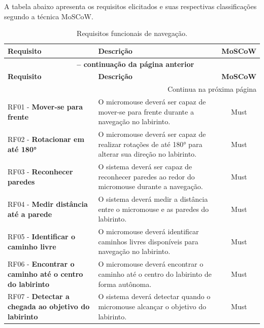     A tabela abaixo apresenta os requisitos elicitados e suas respectivas classificações segundo a técnica MoSCoW.

    \begin{center}
    \begin{longtable}{|p{5.5cm}|p{8cm}|c|}
    \caption{Requisitos funcionais de navegação.} \label{tab:navegacao} \\
    \hline
    \textbf{Requisito} & \textbf{Descrição} & \textbf{MoSCoW} \\ \hline
    \endfirsthead
    \multicolumn{3}{c}{{\bfseries \tablename\ \thetable{} -- continuação da página anterior}} \\
    \hline
    \textbf{Requisito} & \textbf{Descrição} & \textbf{MoSCoW} \\ \hline
    \endhead
    \hline \multicolumn{3}{r}{{Continua na próxima página}} \\ \endfoot
    \hline \endlastfoot

    RF01 - \textbf{Mover-se para frente} & O micromouse deverá ser capaz de mover-se para frente durante a navegação no labirinto. & Must \\ \hline

    RF02 - \textbf{Rotacionar em até 180°} & O micromouse deverá ser capaz de realizar rotações de até 180° para alterar sua direção no labirinto. & Must \\ \hline

    RF03 - \textbf{Reconhecer paredes} & O sistema deverá ser capaz de reconhecer paredes ao redor do micromouse durante a navegação. & Must \\ \hline

    RF04 - \textbf{Medir distância até a parede} & O sistema deverá medir a distância entre o micromouse e as paredes do labirinto. & Must \\ \hline

    RF05 - \textbf{Identificar o caminho livre} & O micromouse deverá identificar caminhos livres disponíveis para navegação no labirinto. & Must \\ \hline

    RF06 - \textbf{Encontrar o caminho até o centro do labirinto} & O micromouse deverá encontrar o caminho até o centro do labirinto de forma autônoma. & Must \\ \hline

    RF07 - \textbf{Detectar a chegada ao objetivo do labirinto} & O sistema deverá detectar quando o micromouse alcançar o objetivo do labirinto. & Must \\ \hline


\end{longtable}
\end{center}

